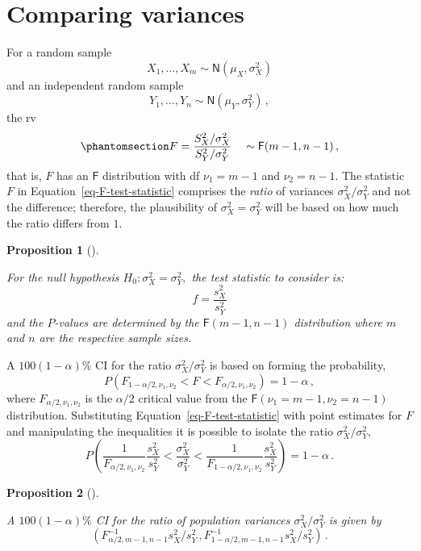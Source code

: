 \documentclass[
  a4paper,
  DIV=11,
  numbers=noendperiod,
  oneside]{scrreprt}
\theoremstyle{plain}
\theoremstyle{definition}
\theoremstyle{definition}
\theoremstyle{definition}
\theoremstyle{plain}
\newtheorem{proposition}{Proposition}[chapter]
\theoremstyle{remark}
\begin{document}
\section{Comparing variances}\label{sec-compare-variances}

For a random sample \[
X_1, \dots, X_m \sim \mathsf{N}(\mu_X, \sigma_X^2)
\] and an independent random sample \[
Y_1, \dots, Y_n \sim \mathsf{N}(\mu_Y, \sigma_Y^2)\,,
\] the rv \begin{equation}\phantomsection\label{eq-F-test-statistic}{
 F = \frac{S_X^2 / \sigma_X^2}{S_Y^2 / \sigma_Y^2} \quad \sim \mathsf{F}(m-1, n-1)\,,
}\end{equation} that is, \(F\) has an \(\mathsf{F}\) distribution with
df \(\nu_1 = m-1\) and \(\nu_2 = n-1.\) The statistic \(F\) in
Equation~\ref{eq-F-test-statistic} comprises the \emph{ratio} of
variances \(\sigma_X^2 / \sigma_Y^2\) and not the difference; therefore,
the plausibility of \(\sigma_X^2 = \sigma_Y^2\) will be based on how
much the ratio differs from \(1.\)

\begin{proposition}[]\protect\hypertarget{prp-htest-compare-variances}{}\label{prp-htest-compare-variances}

For the null hypothesis \(H_0 : \sigma_X^2 = \sigma_Y^2,\) the test
statistic to consider is: \[
f = \frac{s_X^2}{s_Y^2}
\] and the \(P\)-values are determined by the \(\mathsf{F}(m-1, n-1)\)
distribution where \(m\) and \(n\) are the respective sample sizes.

\end{proposition}

A \(100(1-\alpha)\%\) CI for the ratio \(\sigma_X^2 / \sigma_Y^2\) is
based on forming the probability, \[
 P(F_{1-\alpha/2, \nu_1, \nu_2} < F < F_{\alpha/2, \nu_1, \nu_2}) = 1 - \alpha\,,
\] where \(F_{\alpha/2, \nu_1, \nu_2}\) is the \(\alpha/2\) critical
value from the \(\mathsf{F}(\nu_1 = m-1, \nu_2 = n-1)\) distribution.
Substituting Equation~\ref{eq-F-test-statistic} with point estimates for
\(F\) and manipulating the inequalities it is possible to isolate the
ratio \(\sigma_X^2 / \sigma_Y^2,\) \[
 P \left( \frac{1}{F_{\alpha/2, \nu_1, \nu_2}} \frac{s_X^2}{s_Y^2} < \frac{\sigma_X^2}{\sigma_Y^2} < \frac{1}{F_{1-\alpha/2, \nu_1, \nu_2}} \frac{s_X^2}{s_Y^2} \right) 
 = 1 - \alpha \,.
\]

\begin{proposition}[]\protect\hypertarget{prp-ci-compre-variances}{}\label{prp-ci-compre-variances}

A \(100(1-\alpha)\%\) CI for the ratio of population variances
\(\sigma_X^2 / \sigma_Y^2\) is given by \[
 \left(F_{\alpha/2, m-1, n-1}^{-1} s_X^2 / s_Y^2 \,,  F_{1-\alpha/2, m-1, n-1}^{-1} s_X^2 / s_Y^2 \right)\,.
\]

\end{proposition}
\end{document}

